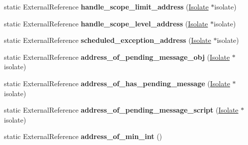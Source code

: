 \begin{DoxyCompactItemize}
\item 
\hypertarget{classv8_1_1internal_1_1_b_a_s_e___e_m_b_e_d_d_e_d_a5a244a4789e1d20bbe09debba8d5d174}{}static External\+Reference {\bfseries handle\+\_\+scope\+\_\+limit\+\_\+address} (\hyperlink{classv8_1_1internal_1_1_isolate}{Isolate} $\ast$isolate)\label{classv8_1_1internal_1_1_b_a_s_e___e_m_b_e_d_d_e_d_a5a244a4789e1d20bbe09debba8d5d174}

\item 
\hypertarget{classv8_1_1internal_1_1_b_a_s_e___e_m_b_e_d_d_e_d_afd264d1c80531731c8ad36781b09e7fb}{}static External\+Reference {\bfseries handle\+\_\+scope\+\_\+level\+\_\+address} (\hyperlink{classv8_1_1internal_1_1_isolate}{Isolate} $\ast$isolate)\label{classv8_1_1internal_1_1_b_a_s_e___e_m_b_e_d_d_e_d_afd264d1c80531731c8ad36781b09e7fb}

\item 
\hypertarget{classv8_1_1internal_1_1_b_a_s_e___e_m_b_e_d_d_e_d_aabedf7ad526f35f31066bf40488291b0}{}static External\+Reference {\bfseries scheduled\+\_\+exception\+\_\+address} (\hyperlink{classv8_1_1internal_1_1_isolate}{Isolate} $\ast$isolate)\label{classv8_1_1internal_1_1_b_a_s_e___e_m_b_e_d_d_e_d_aabedf7ad526f35f31066bf40488291b0}

\item 
\hypertarget{classv8_1_1internal_1_1_b_a_s_e___e_m_b_e_d_d_e_d_a6709ca0913e3c100534fb043b99290c7}{}static External\+Reference {\bfseries address\+\_\+of\+\_\+pending\+\_\+message\+\_\+obj} (\hyperlink{classv8_1_1internal_1_1_isolate}{Isolate} $\ast$isolate)\label{classv8_1_1internal_1_1_b_a_s_e___e_m_b_e_d_d_e_d_a6709ca0913e3c100534fb043b99290c7}

\item 
\hypertarget{classv8_1_1internal_1_1_b_a_s_e___e_m_b_e_d_d_e_d_a5899d9584f6c16cb42efad1df6f49b18}{}static External\+Reference {\bfseries address\+\_\+of\+\_\+has\+\_\+pending\+\_\+message} (\hyperlink{classv8_1_1internal_1_1_isolate}{Isolate} $\ast$isolate)\label{classv8_1_1internal_1_1_b_a_s_e___e_m_b_e_d_d_e_d_a5899d9584f6c16cb42efad1df6f49b18}

\item 
\hypertarget{classv8_1_1internal_1_1_b_a_s_e___e_m_b_e_d_d_e_d_a25288dd1ccb18552dafe33671007fb97}{}static External\+Reference {\bfseries address\+\_\+of\+\_\+pending\+\_\+message\+\_\+script} (\hyperlink{classv8_1_1internal_1_1_isolate}{Isolate} $\ast$isolate)\label{classv8_1_1internal_1_1_b_a_s_e___e_m_b_e_d_d_e_d_a25288dd1ccb18552dafe33671007fb97}

\item 
\hypertarget{classv8_1_1internal_1_1_b_a_s_e___e_m_b_e_d_d_e_d_a080d2e880869c6ee68e4794e7abe2160}{}static External\+Reference {\bfseries address\+\_\+of\+\_\+min\+\_\+int} ()\label{classv8_1_1internal_1_1_b_a_s_e___e_m_b_e_d_d_e_d_a080d2e880869c6ee68e4794e7abe2160}


\end{DoxyCompactItemize}
